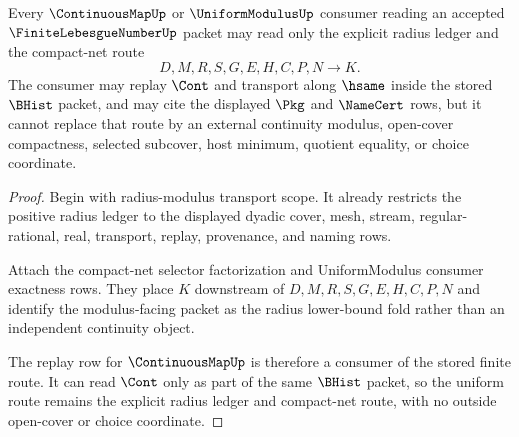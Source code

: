 \begin{theorem}
\label{thm:finite-lebesgue-number-continuousmap-uniform-route-row}
Every $\ContinuousMapUp$ or $\UniformModulusUp$ consumer reading an accepted $\FiniteLebesgueNumberUp$ packet may read only the explicit radius ledger and the compact-net route
$$
D,M,R,S,G,E,H,C,P,N \to K.
$$
The consumer may replay $\Cont$ and transport along $\hsame$ inside the stored $\BHist$ packet, and may cite the displayed $\Pkg$ and $\NameCert$ rows, but it cannot replace that route by an external continuity modulus, open-cover compactness, selected subcover, host minimum, quotient equality, or choice coordinate.
\end{theorem}
\begin{proof}
Begin with radius-modulus transport scope. It already restricts the positive radius ledger to the displayed dyadic cover, mesh, stream, regular-rational, real, transport, replay, provenance, and naming rows.

Attach the compact-net selector factorization and UniformModulus consumer exactness rows. They place $K$ downstream of $D,M,R,S,G,E,H,C,P,N$ and identify the modulus-facing packet as the radius lower-bound fold rather than an independent continuity object.

The replay row for $\ContinuousMapUp$ is therefore a consumer of the stored finite route. It can read $\Cont$ only as part of the same $\BHist$ packet, so the uniform route remains the explicit radius ledger and compact-net route, with no outside open-cover or choice coordinate.
\end{proof}

